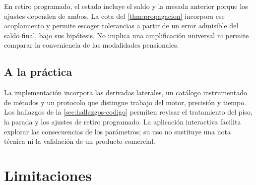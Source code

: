 En retiro programado, el estado incluye el saldo y la mesada anterior porque los
ajustes dependen de ambos. La cota del \cref{thm:propagacion} incorpora ese
acoplamiento y permite escoger tolerancias a partir de un error admisible del
saldo final, bajo sus hipótesis. No implica una amplificación universal ni
permite comparar la conveniencia de las modalidades pensionales.

\subsection{A la práctica}

La implementación incorpora las derivadas laterales, un catálogo instrumentado de
\datoNMetodos{} métodos y un protocolo que distingue trabajo del motor,
precisión y tiempo. Los hallazgos de la \cref{sec:hallazgos-codigo} permiten
revisar el tratamiento del piso, la parada y los ajustes de retiro programado.
La aplicación interactiva facilita explorar las consecuencias de los parámetros;
su uso no sustituye una nota técnica ni la validación de un producto comercial.

\section{Limitaciones}

